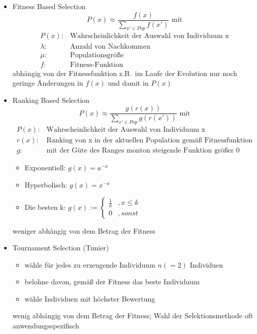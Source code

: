 \begin{itemize}
	\item Fitness Based Selection
	\begin{equation*}
		P(x) \approx \frac{f(x)}{\sum_{x' \in Pop} f(x')} \text{ mit}
	\end{equation*}
	\begin{align*}
		P(x): & \text{Wahrscheinlichkeit der Auswahl von Individuum x} \\
		\lambda: & \text{Anzahl von Nachkommen} \\
		\mu: & \text{Populationsgröße} \\
		f: & \text{Fitness-Funktion}
	\end{align*}
	abhängig von der Fitnessfunktion z.B.\ im Laufe der Evolution nur noch geringe Änderungen in $f(x)$ und damit in $P(x)$
	\item Ranking Based Selection
	\begin{equation*}
		P(x) \approx \frac{g(r(x))}{\sum_{x' \in Pop} g(r(x'))} \text{ mit}
	\end{equation*}
	\begin{align*}
		P(x): & \text{Wahrscheinlichkeit der Auswahl von Individuum x} \\
		r(x): & \text{Ranking von x in der aktuellen Population gemäß Fitnessfunktion} \\
		g: & \text{mit der Güte des Ranges monton steigende Funktion größer 0}
	\end{align*}
	\begin{itemize}
		\item Exponentiell: $g(x) = a^{-x}$
		\item Hyperbolisch: $g(x) = x^{-a}$
		\item Die besten k: $g(x) := 
		\begin{cases}
			\frac{1}{k} &, x \leq k \\
			0 &, sonst
		\end{cases}$
	\end{itemize}
	weniger abhängig von dem Betrag der Fitness
	\item Tournament Selection (Tunier)
	\begin{itemize}
		\item wähle für jedes zu erzeugende Individuum $n (=2)$ Individuen
		\item belohne davon, gemäß der Fitness das beste Individuum
		\item wähle Individuen mit höchster Bewertung
	\end{itemize}
	wenig abhängig von dem Betrag der Fitness; Wahl der Selektionsmethode oft anwendungsspezifisch
\end{itemize}
